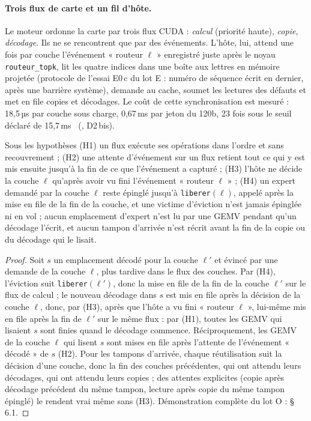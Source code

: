 \paragraph{Trois flux de carte et un fil d'hôte.} Le moteur ordonne la carte par trois flux CUDA : \emph{calcul} (priorité haute), \emph{copie}, \emph{décodage}. Ils ne se rencontrent que par des événements. L'hôte, lui, attend une fois par couche l'événement « routeur $\ell$ » enregistré juste après le noyau \texttt{routeur\_topk}, lit les quatre indices dans une boîte aux lettres en mémoire projetée (protocole de l'essai E0\,c du lot E : numéro de séquence écrit en dernier, après une barrière système), demande au cache, soumet les lectures des défauts et met en file copies et décodages. Le coût de cette synchronisation est mesuré : 18,5\,µs par couche sous charge, 0,67\,ms par jeton du 120b, 23 fois sous le seuil déclaré de 15,7\,ms \mes~(, D2\,bis).

\begin{lemme}\label{t2arch:lem:ordre}
Sous les hypothèses (H1) un flux exécute ses opérations dans l'ordre et sans recouvrement ; (H2) une attente d'événement sur un flux retient tout ce qui y est mis ensuite jusqu'à la fin de ce que l'événement a capturé ; (H3) l'hôte ne décide la couche $\ell$ qu'après avoir vu fini l'événement « routeur $\ell$ » ; (H4) un expert demandé par la couche $\ell$ reste épinglé jusqu'à \texttt{liberer}$(\ell)$, appelé après la mise en file de la fin de la couche, et une victime d'éviction n'est jamais épinglée ni en vol ; aucun emplacement d'expert n'est lu par une GEMV pendant qu'un décodage l'écrit, et aucun tampon d'arrivée n'est récrit avant la fin de la copie ou du décodage qui le lisait.
\end{lemme}

\begin{proof}
Soit $s$ un emplacement décodé pour la couche $\ell'$ et évincé par une demande de la couche $\ell$, plus tardive dans le flux des couches. Par (H4), l'éviction suit \texttt{liberer}$(\ell')$, donc la mise en file de la fin de la couche $\ell'$ sur le flux de calcul ; le nouveau décodage dans $s$ est mis en file après la décision de la couche $\ell$, donc, par (H3), après que l'hôte a vu fini « routeur $\ell$ », lui-même mis en file après la fin de $\ell'$ sur le même flux : par (H1), toutes les GEMV qui lisaient $s$ sont finies quand le décodage commence. Réciproquement, les GEMV de la couche $\ell$ qui lisent $s$ sont mises en file après l'attente de l'événement « décodé » de $s$ (H2). Pour les tampons d'arrivée, chaque réutilisation suit la décision d'une couche, donc la fin des couches précédentes, qui ont attendu leurs décodages, qui ont attendu leurs copies ; des attentes explicites (copie après décodage précédent du même tampon, lecture après copie du même tampon épinglé) le rendent vrai même sans (H3). Démonstration complète du lot O :  §\,6.1.
\end{proof}

